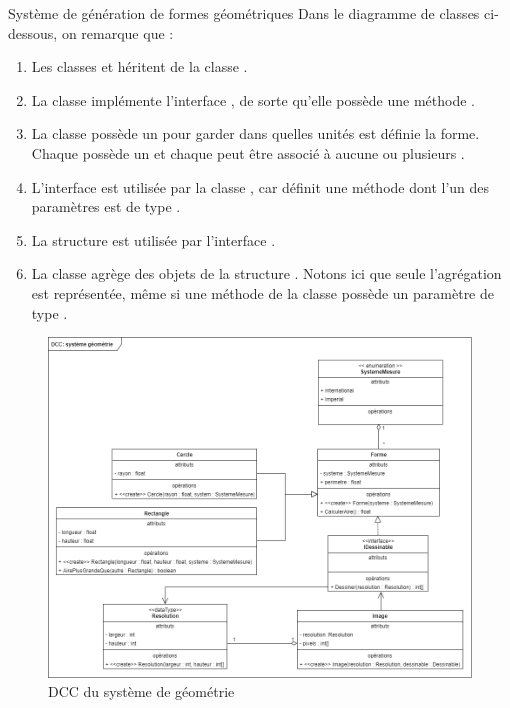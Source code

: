 \begin{exemple}{Système de génération de formes géométriques}
	Dans le diagramme de classes ci-dessous, on remarque que :
	\begin{enumerate}
		\item Les classes  et  héritent de la classe .
		\item La classe  implémente l'interface , de sorte qu'elle possède une méthode .
		\item La classe  possède un  pour garder dans quelles unités est définie la forme. Chaque  possède un  et chaque  peut être associé à aucune ou plusieurs .
		\item L'interface  est utilisée par la classe , car  définit une méthode dont l'un des paramètres est de type .
		\item La structure  est utilisée par l'interface . 
		\item La classe  agrège des objets de la structure . Notons ici que seule l'agrégation est représentée, même si une méthode de la classe  possède un paramètre de type .
	\end{enumerate}
	
	\begin{figure}[H]
		\caption{\acrshort{DCC} du système de géométrie}  
		\centering
		\includegraphics[scale=0.5, angle=90]{dcc-rect-relations.png}
	\end{figure}
\end{exemple}


